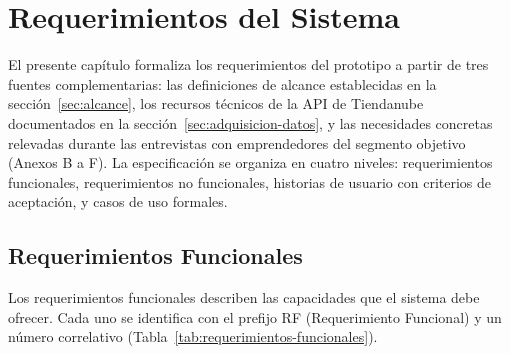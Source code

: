 \chapter{Requerimientos del Sistema}
\label{cha:requerimientos}

El presente capítulo formaliza los requerimientos del prototipo a partir de tres fuentes complementarias: las definiciones de alcance establecidas en la sección~\ref{sec:alcance}, los recursos técnicos de la API de Tiendanube documentados en la sección~\ref{sec:adquisicion-datos}, y las necesidades concretas relevadas durante las entrevistas con emprendedores del segmento objetivo (Anexos B a F). La especificación se organiza en cuatro niveles: requerimientos funcionales, requerimientos no funcionales, historias de usuario con criterios de aceptación, y casos de uso formales.

\section{Requerimientos Funcionales}
\label{sec:requerimientos-funcionales}

Los requerimientos funcionales describen las capacidades que el sistema debe ofrecer. Cada uno se identifica con el prefijo RF (Requerimiento Funcional) y un número correlativo (Tabla~\ref{tab:requerimientos-funcionales}).

